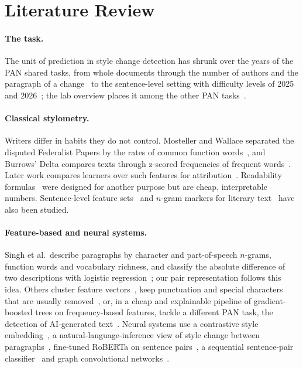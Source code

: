 \documentclass[runningheads]{llncs}
\begin{document}
\section{Literature Review}
\label{sec:related}

\paragraph{The task.} The unit of prediction in style change detection has shrunk over the years of the PAN shared tasks, from whole documents through the number of authors and the paragraph of a change~\cite{zangerle2020overview,bevendorff2021overview} to the sentence-level setting with difficulty levels of 2025 and 2026~\cite{zangerle2025overview,zangerle:2026}; the lab overview places it among the other PAN tasks~\cite{bevendorff:2026b}.

\paragraph{Classical stylometry.} Writers differ in habits they do not control. Mosteller and Wallace separated the disputed Federalist Papers by the rates of common function words~\cite{mosteller1964inference}, and Burrows' Delta compares texts through z-scored frequencies of frequent words~\cite{burrows2002delta}. Later work compares learners over such features for attribution~\cite{10.1093/llc/fqq001}. Readability formulas~\cite{flesch1948new,gunning1952technique,kincaid1975derivation} were designed for another purpose but are cheap, interpretable numbers. Sentence-level feature sets~\cite{oloo2022optimal} and $n$-gram markers for literary text~\cite{rios2022detection} have also been studied.

\paragraph{Feature-based and neural systems.} Singh et al.\ describe paragraphs by character and part-of-speech $n$-grams, function words and vocabulary richness, and classify the absolute difference of two descriptions with logistic regression~\cite{singh2021writing}; our pair representation follows this idea. Others cluster feature vectors~\cite{alshamasi2022ensemble}, keep punctuation and special characters that are usually removed~\cite{zamir2024stylometry}, or, in a cheap and explainable pipeline of gradient-boosted trees on frequency-based features, tackle a different PAN task, the detection of AI-generated text~\cite{ochab2025styloch}. Neural systems use a contrastive style embedding~\cite{Chen2023AWS}, a natural-language-inference view of style change between paragraphs~\cite{kucukkaya2023arc}, fine-tuned RoBERTa on sentence pairs~\cite{rohra2025sentence}, a sequential sentence-pair classifier~\cite{schmidt2025team} and graph convolutional networks~\cite{alsheddi2025team}.
\end{document}
